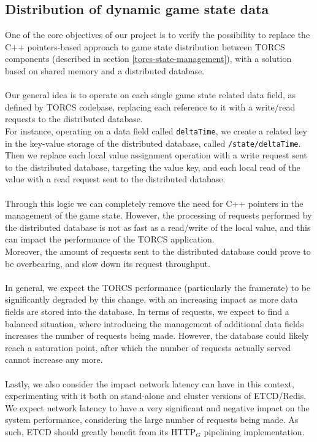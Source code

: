 \subsection{Distribution of dynamic game state data}
One of the core objectives of our project is to verify the possibility to replace the C++ pointers-based approach to game state distribution between TORCS components (described in section \ref{torcs-state-management}), with a solution based on shared memory and a distributed database. \\ \\
Our general idea is to operate on each single game state related data field, as defined by TORCS codebase, replacing each reference to it with a write/read requests to the distributed database. \\
For instance, operating on a data field called \texttt{deltaTime}, we create a related key in the key-value storage of the distributed database, called \texttt{/state/deltaTime}. Then we replace each local value assignment operation with a write request sent to the distributed database, targeting the value key, and each local read of the value with a read request sent to the distributed database. \\ \\
Through this logic we can completely remove the need for C++ pointers in the management of the game state. However, the processing of requests performed by the distributed database is not as fast as a read/write of the local value, and this can impact the performance of the TORCS application. \\
Moreover, the amount of requests sent to the distributed database could prove to be overbearing, and slow down its request throughput. \\ \\
In general, we expect the TORCS performance (particularly the framerate) to be significantly degraded by this change, with an increasing impact as more data fields are stored into the database. In terms of requests, we expect to find a balanced situation, where introducing the management of additional data fields increases the number of requests being made. However, the database could likely reach a saturation point, after which the number of requests actually served cannot increase any more. \\ \\
Lastly, we also consider the impact network latency can have in this context, experimenting with it both on stand-alone and cluster versions of ETCD/Redis. We expect network latency to have a very significant and negative impact on the system performance, considering the large number of requests being made. As such, ETCD should greatly benefit from its HTTP$_G$ pipelining implementation.

